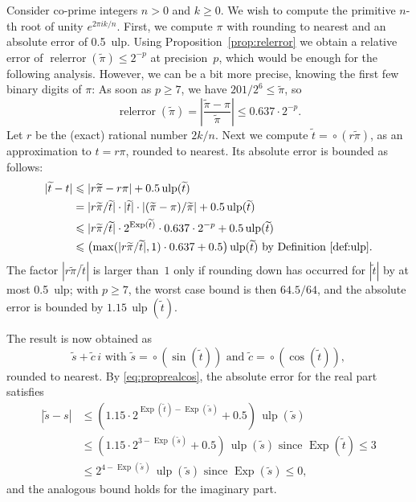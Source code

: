 \documentclass [11pt]{article}
\newcommand {\corr}[1]{{#1}}
\newcommand {\appro}[1]{\widetilde {#1}}
\newcommand {\ulp}[1]{#1~ulp}
\newcommand {\Ulp}{{\operatorname {ulp}}}
\DeclareMathOperator{\Exp}{\operatorname {Exp}}
\newcommand{\relerror}{\operatorname {relerror}}
\newcommand {\round}{\operatorname {\circ}}
\renewcommand {\leq}{\leqslant}
\renewcommand {\geq}{\geqslant}
\begin{document}
Consider co-prime integers $n > 0$ and $k \geq 0$. We wish to compute
the primitive $n$-th root of unity $e^{2 \pi i k / n}$.
First, we compute $\pi$ with rounding to nearest and an absolute error
of \ulp{0.5}. Using Proposition~\ref {prop:relerror} we obtain a relative
error of $\relerror (\appro {\pi}) \leq 2^{-p}$ at precision~$p$, which
would be enough for the following analysis. However, we can be a bit more
precise, knowing the first few binary digits of $\pi$: As soon as $p \geq 7$,
we have $201/2^6 \leq \appro {\pi}$, so
\[
\relerror (\appro {\pi})
= \left| \frac {\appro {\pi} - \corr {\pi}}{\appro {\pi}} \right|
\leq 0.637 \cdot 2^{-p}.
\]
Let $r$ be the (exact) rational number $2k/n$.
Next we compute
$\appro {t} = \round (r \appro {\pi})$, as an approximation to
$\corr {t} = r \pi$, rounded to nearest.
Its absolute error is bounded as follows:
\begin {align*}
| \appro {t} - \corr {t} |
& \leq |r \appro {\pi} - r \corr {\pi}| + 0.5 \, \Ulp (\appro {t}) \\
& =  |r \appro {\pi} / \appro {t}| \cdot |\appro {t}|
     \cdot |(\appro {\pi} - \corr {\pi}) / \appro {\pi}|
     + 0.5 \, \Ulp (\appro {t}) \\
& \leq |r \appro {\pi} / \appro {t}| \cdot 2^{\Exp (\appro {t})}
     \cdot 0.637 \cdot 2^{-p} + 0.5 \, \Ulp (\appro {t}) \\
& \leq \left( \max (|r \appro {\pi} / \appro {t}|, 1) \cdot 0.637
              + 0.5 \right) \Ulp (\appro {t})
  \text { by Definition~\ref {def:ulp}}.
\end {align*}
The factor $|r \appro {\pi} / \appro {t}|$ is larger than~$1$ only if
rounding down has occurred for $|\appro {t}|$ by at most \ulp {0.5};
with $p \geq 7$, the worst case bound is then $64.5/64$,
and the absolute error is bounded by $1.15 \, \Ulp (\appro {t})$.

The result is now obtained as
\[
\appro {s} + \appro {c} \, i
\text { with }
\appro {s} = \round (\sin (\appro {t}))
\text { and }
\appro {c} = \round (\cos (\appro {t})),
\]
rounded to nearest.
By \eqref {eq:proprealcos}, the absolute error for the real part satisfies
\begin {align*}
|\appro {s} - \corr {s}|
& \leq \left( 1.15 \cdot 2^{\Exp (\appro {t}) - \Exp (\appro {s})}
   + 0.5 \right) \, \Ulp (\appro {s}) \\
& \leq \left( 1.15 \cdot 2^{3 - \Exp (\appro {s})} + 0.5 \right)
   \, \Ulp (\appro {s}) \text { since } \Exp (\appro {t}) \leq 3 \\
& \leq 2^{4 - \Exp (\appro {s})} \, \Ulp (\appro {s})
   \text { since } \Exp (\appro {s}) \leq 0,
\end {align*}
and the analogous bound holds for the imaginary part.
\end{document}
